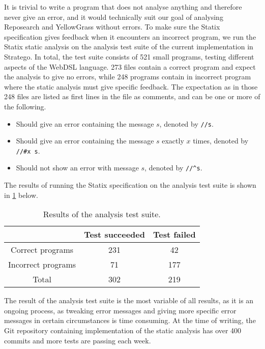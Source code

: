     It is trivial to write a program that does not analyse anything and therefore never give an error, and it would technically suit our goal of analysing Reposearch and YellowGrass without errors. To make sure the Statix specification gives feedback when it encounters an incorrect program, we run the Statix static analysis on the analysis test suite of the current implementation in Stratego. In total, the test suite consists of 521 small programs, testing different aspects of the WebDSL language. 273 files contain a correct program and expect the analysis to give no errors, while 248 programs contain in incorrect program where the static analysis must give specific feedback. The expectation as in those 248 files are listed as first lines in the file as comments, and can be one or more of the following.

    \begin{itemize}
      \item Should give an error containing the message $s$, denoted by \texttt{//s}.
      \item Should give an error containing the message $s$ exactly $x$ times, denoted by \texttt{//\#x s}.
      \item Should not show an error with message $s$, denoted by \texttt{//\^{}s}.
    \end{itemize}

    The results of running the Statix specification on the analysis test suite is shown in \cref{tbl:statix-test-suite-results} below.

    \begin{table}[h]
      \centering
      \begin{tabular}{ | c || c | c | }
        \hline
        & Test succeeded & Test failed \\
        \hline
        Correct programs & 231 & 42 \\
        \hline
        Incorrect programs & 71 & 177 \\
        \hline\hline
        Total & 302 & 219 \\
        \hline
      \end{tabular}
      \caption{\label{tbl:statix-test-suite-results}Results of the analysis test suite.}
    \end{table}

    The result of the analysis test suite is the most variable of all results, as it is an ongoing process, as tweaking error messages and giving more specific error messages in certain circumstances is time consuming. At the time of writing, the Git repository containing implementation of the static analysis has over 400 commits and more tests are passing each week.

